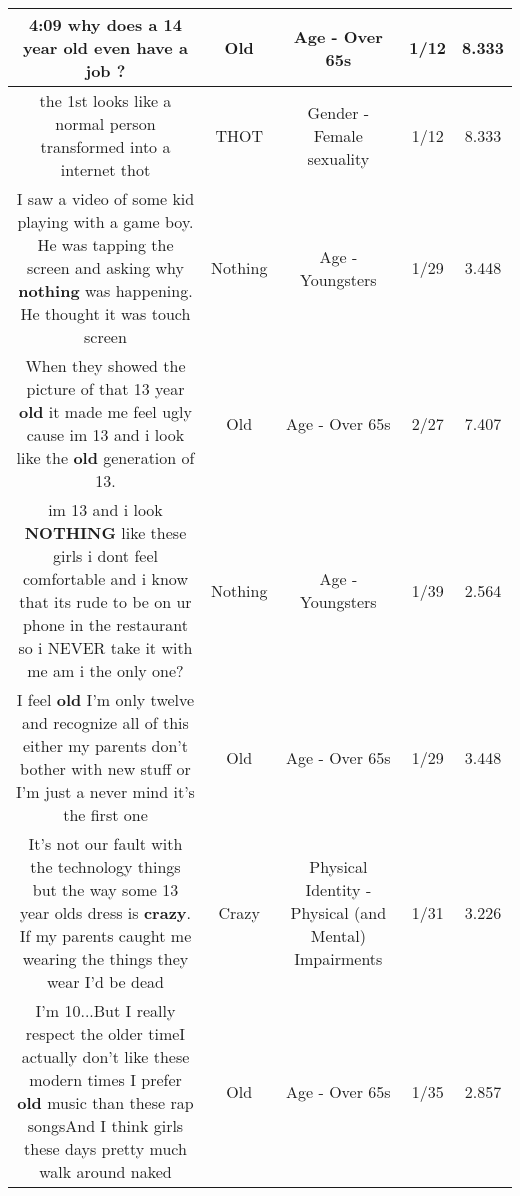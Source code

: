 \documentclass[11pt]{article}
\newlength\mylength
\begin{document}
\begin{center}
\begin{longtable}{|C{.65\mylength}|C{.30\mylength}|C{.12\mylength}|C{.12\mylength}|C{.12\mylength}|}
  \small 4:09 why does a 14 year \textbf{old} even have a job ?\normalsize   & Old & Age - Over 65s & 1/12 & 8.333 \\  \hline
  \small the 1st looks like a normal person transformed into a internet thot\normalsize   & THOT & Gender - Female sexuality & 1/12 & 8.333 \\  \hline
  \small I saw a video of some kid playing with a game boy. He was tapping the screen and asking why \textbf{nothing} was happening. He thought it was touch screen\normalsize   & Nothing & Age - Youngsters & 1/29 & 3.448 \\  \hline
  \small When they showed the picture of that 13 year \textbf{old} it made me feel ugly cause im 13 and i look like the \textbf{old} generation of 13.\normalsize   & Old & Age - Over 65s & 2/27 & 7.407 \\  \hline
  \small im 13 and i look \textbf{NOTHING} like these girls i dont feel comfortable and i know that its rude to be on ur phone in the restaurant so i NEVER take it with me am i the only one?\normalsize   & Nothing & Age - Youngsters & 1/39 & 2.564 \\  \hline
  \small I feel \textbf{old} I'm only twelve and recognize all of this either my parents don't bother with new stuff or I'm just a never mind it's the first one\normalsize   & Old & Age - Over 65s & 1/29 & 3.448 \\  \hline
  \small It's not our fault with the technology things but the way some 13 year olds dress is \textbf{crazy}. If my parents caught me wearing the things they wear I'd be dead\normalsize   & Crazy & Physical Identity - Physical (and Mental) Impairments & 1/31 & 3.226 \\  \hline
  \small I'm 10...But I really respect the older timeI actually don't like these modern times I prefer \textbf{old} music than these rap songsAnd I think girls these days pretty much walk around naked\normalsize   & Old & Age - Over 65s & 1/35 & 2.857 \\  \hline

\end{longtable}
\end{center}
\end{document}
